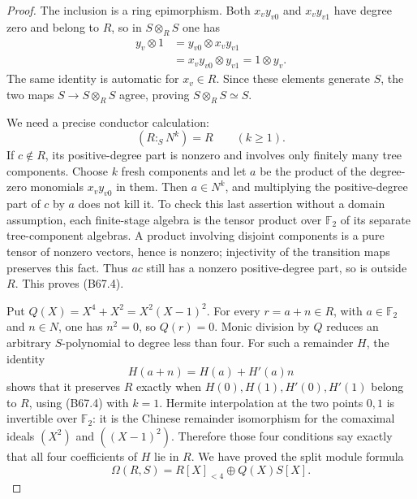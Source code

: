 \begin{proof}
The inclusion is a ring epimorphism. Both
$x_vy_{v0}$ and $x_vy_{v1}$ have degree zero
and belong to $R$, so in $S\otimes_R S$ one has
\[
\begin{aligned}
 y_v\otimes1
 &=y_{v0}\otimes x_vy_{v1}\\
 &=x_vy_{v0}\otimes y_{v1}
 =1\otimes y_v.
\end{aligned}                                             \tag{B67.3}
\]
The same identity is automatic for $x_v\in R$.
Since these elements generate $S$, the two
maps $S\to S\otimes_R S$ agree, proving
$S\otimes_R S\simeq S$.

We need a precise conductor calculation:
\[
                        (R:_S N^k)=R\qquad(k\ge1).        \tag{B67.4}
\]
If $c\notin R$, its positive-degree part is
nonzero and involves only finitely many tree
components. Choose $k$ fresh components and
let $a$ be the product of the degree-zero
monomials $x_vy_{v0}$ in them. Then $a\in N^k$,
and multiplying the positive-degree part of
$c$ by $a$ does not kill it. To check this
last assertion without a domain assumption,
each finite-stage algebra is the tensor
product over $\mathbb F_2$ of its separate
tree-component algebras. A product involving
disjoint components is a pure tensor of
nonzero vectors, hence is nonzero; injectivity
of the transition maps preserves this fact.
Thus $ac$ still has a nonzero positive-degree
part, so is outside $R$. This proves (B67.4).

Put $Q(X)=X^4+X^2=X^2(X-1)^2$. For every
$r=a+n\in R$, with $a\in\mathbb F_2$ and
$n\in N$, one has $n^2=0$, so $Q(r)=0$.
Monic division by $Q$ reduces an arbitrary
$S$-polynomial to degree less than four.
For such a remainder $H$, the identity
\[
                    H(a+n)=H(a)+H'(a)n
\]
shows that it preserves $R$ exactly when
$H(0),H(1),H'(0),H'(1)$ belong to $R$,
using (B67.4) with $k=1$.
Hermite interpolation at the two points $0,1$
is invertible over $\mathbb F_2$: it is the
Chinese remainder isomorphism for the
comaximal ideals $(X^2)$ and $((X-1)^2)$.
Therefore those four conditions say exactly
that all four coefficients of $H$ lie in $R$.
We have proved the split module formula
\[
                  \Omega(R,S)=R[X]_{<4}\oplus Q(X)S[X].  \tag{B67.5}
\]


\end{proof}
